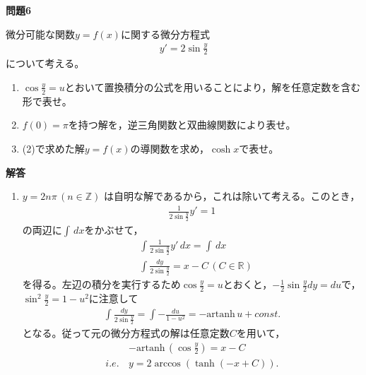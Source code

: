 \documentclass[a4paper,12pt,dvipdfmx,fleqn, oneside]{jsarticle}
\theoremstyle{defstyle}
\theoremstyle{thmx}
\theoremstyle{qesstyle}
\begin{document}
\begin{shadebox}
    \textbf{問題6}

    微分可能な関数$y=f(x)$に関する微分方程式
    \begin{align*}
        y'=2 \sin \frac{y}{2}
    \end{align*}
    について考える。
    \begin{enumerate}
        \item $\cos \frac{y}{2}=u$とおいて置換積分の公式を用いることにより，解を任意定数を含む形で表せ。
        \item $f(0)= \pi $を持つ解を，逆三角関数と双曲線関数により表せ。
        \item (2)で求めた解$y=f(x)$の導関数を求め，$\cosh x$で表せ。
    \end{enumerate}
\end{shadebox}
\begin{screen}
    \textbf{解答}
    \begin{enumerate}
        \item $y = 2n \pi \, (n \in \mathbb{Z})$ は自明な解であるから，これは除いて考える。このとき，
              \begin{align*}
                  \frac{1}{2 \sin \frac{y}{2}} y' = 1
              \end{align*}
              の両辺に$\int \, dx$をかぶせて，
              \begin{align*}
                   & \int \frac{1}{2 \sin \frac{y}{2}} y' \, dx = \int  \, dx         \\
                   & \int \frac{dy}{2 \sin \frac{y}{2}} = x - C \, (C \in \mathbb{R})
              \end{align*}
              を得る。左辺の積分を実行するため$\cos \frac{y}{2} = u$とおくと，$- \frac{1}{2}\sin \frac{y}{2} dy = du$で，$\sin^2 \frac{y}{2} = 1- u^2$に注意して
              \begin{align*}
                  \int \frac{dy}{2 \sin \frac{y}{2}} = \int -\frac{du}{1-u^2} = - \text{artanh}\,  u+ const.
              \end{align*}
              となる。従って元の微分方程式の解は任意定数$C$を用いて，
              \begin{align*}
                         & -\text{artanh} \, (\cos \frac{y}{2})  = x - C             \\
                  i.e.\, & y                             = 2 \arccos (\tanh (-x+C)).
              \end{align*}
    \end{enumerate}
\end{screen}
\end{document}
